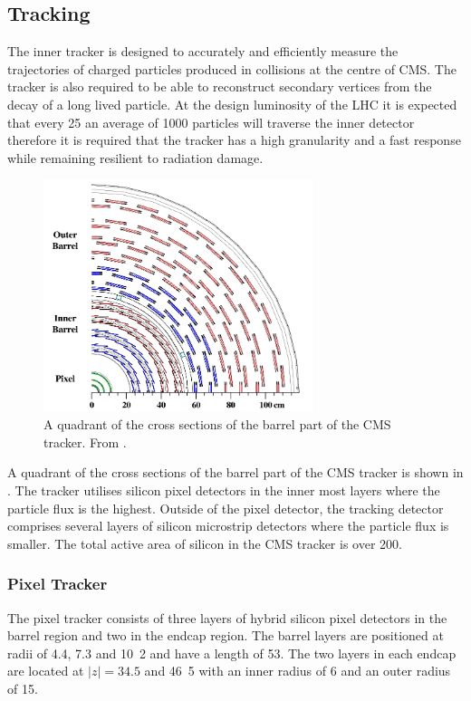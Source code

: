 \subsection{Tracking}
The inner tracker is designed to accurately and efficiently measure the
trajectories of charged particles produced in collisions at the centre of CMS.
The tracker is also required to be able to reconstruct secondary vertices from
the decay of a long lived particle.  At the design luminosity of the LHC it
is expected that every \unit{25}{\ns} an average of 1000 particles will traverse
the inner detector therefore it is required that the tracker has a high
granularity and a fast response while remaining resilient to radiation damage. 

\begin{figure}[htbp]
  \centering
  \includegraphics[width=0.7\textwidth]{tracker}
  \caption{A quadrant of the cross sections of the barrel part of the {CMS}
tracker. From \cite{cmsgsf}.}
  \label{fig:tracker}
\end{figure}

A quadrant of the cross sections of the barrel part of the {CMS}
tracker is shown in .
The tracker utilises silicon pixel detectors in the inner most layers where the
particle flux is the highest.  Outside of the pixel detector, the tracking
detector comprises several layers of silicon microstrip detectors where the
particle flux is smaller.  The total active area of silicon in the CMS tracker
is over \unit{200}{\meter\squared}.\cite{chatrchyan2008cms}

\subsubsection{Pixel Tracker}
The pixel tracker consists of three layers of hybrid silicon pixel detectors in
the barrel region and two in the endcap region. 
The barrel layers are positioned at radii of 4.4, 7.3 and \unit{10.2}{\cm} and have
a length of \unit{53}{\cm}. The two layers in each endcap are located at
$|z|=34.5$ and \unit{46.5}{\cm} with an inner radius of \unit{6}{\cm} and an
outer radius of \unit{15}{\cm}.

